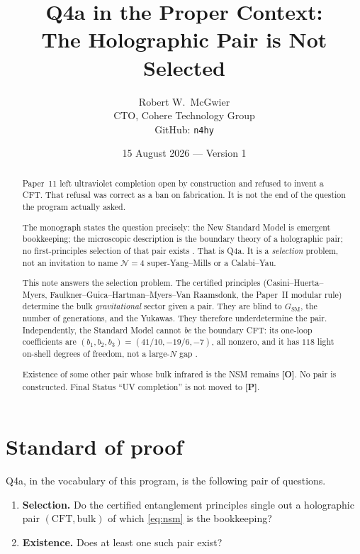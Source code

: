 \documentclass[11pt]{article}
\title{\textbf{Q4a in the Proper Context:\\
The Holographic Pair is Not Selected}}
\author{Robert W.\ McGwier\\
\small CTO, Cohere Technology Group\\
\small GitHub: \texttt{n4hy}}
\date{15 August 2026 --- Version 1}
\theoremstyle{definition}
\newcommand{\pP}{\textbf{[P]}}
\newcommand{\pO}{\textbf{[O]}}
\begin{document}
\maketitle

\begin{abstract}
\noindent
Paper~11 left ultraviolet completion open by construction and refused
to invent a CFT. That refusal was correct as a ban on fabrication.
It is not the end of the question the program actually asked.

The monograph states the question precisely: the New Standard Model
is emergent bookkeeping; the microscopic description is the boundary
theory of a holographic pair; no first-principles selection of that
pair exists \cite{McGwierMonograph}. That is Q4a. It is a
\emph{selection} problem, not an invitation to name $\mathcal{N}=4$
super-Yang--Mills or a Calabi--Yau.

This note answers the selection problem. The certified principles
(Casini--Huerta--Myers, Faulkner--Guica--Hartman--Myers--Van
Raamsdonk, the Paper~II modular rule) determine the bulk
\emph{gravitational} sector given a pair. They are blind to
$G_{\mathrm{SM}}$, the number of generations, and the Yukawas.
They therefore underdetermine the pair. Independently, the Standard
Model cannot \emph{be} the boundary CFT: its one-loop coefficients
are
$(b_1,b_2,b_3)=(41/10,-19/6,-7)$, all nonzero, and it has $118$
light on-shell degrees of freedom, not a large-$N$ gap
\cite{Heemskerk2009}.

Existence of some other pair whose bulk infrared is the NSM remains
\pO{}. No pair is constructed. Final Status ``UV completion'' is
not moved to \pP{}.
\end{abstract}

\section*{Standard of proof}

Q4a, in the vocabulary of this program, is the following pair of
questions.

\begin{enumerate}[leftmargin=1.6em]
\item \textbf{Selection.} Do the certified entanglement principles
single out a holographic pair $(\mathrm{CFT},\mathrm{bulk})$ of
which \eqref{eq:nsm} is the bookkeeping?
\item \textbf{Existence.} Does at least one such pair exist?
\end{enumerate}
\end{document}
